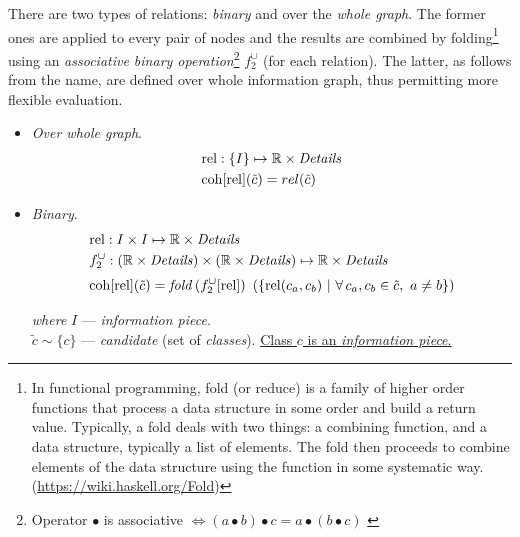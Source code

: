 \documentclass[../ThesisDoc]{subfiles}
\begin{document}
\begin{enumerate}
        There are two types of relations: \emph{binary} and over the \emph{whole graph}.
        The former ones are applied to every pair of nodes and the results are combined
        by folding\footnote{
          In functional programming, fold (or reduce) is a family of higher order
          functions that process a data structure in some order and build a return value.
          Typically, a fold deals with two things: a combining
          function, and a data structure, typically a list of elements.
          The fold then proceeds to combine elements of the data structure using
          the function in some systematic way. (\url{https://wiki.haskell.org/Fold})
        } using an \emph{associative binary operation}\footnote{%
          Operator $\bullet$ is associative
          $\Leftrightarrow (a \bullet b) \bullet c = a \bullet (b \bullet c)$
            \label{footnote:binary-operation}
        } $f^\cup_2$ (for each relation).
        The latter, as follows from the name, are defined over whole information graph,
        thus permitting more flexible evaluation.
        \begin{itemize}
          \item \emph{Over whole graph}.
            \begin{align*}
              & \mathrm{rel}: \lbrace I \rbrace \mapsto \mathbb{R} \times \mathit{Details} \\
              & \mathrm{coh}[\mathrm{rel}](\tilde{c}) = rel(\tilde{c})
            \end{align*}
          \item \emph{Binary}.
            \begin{align*}
              & \mathrm{rel}: I \times I \mapsto \mathbb{R} \times \mathit{Details} \\
              & f^\cup_2: (\mathbb{R} \times \mathit{Details}) \times
                          (\mathbb{R} \times \mathit{Details})
                   \mapsto \mathbb{R} \times \mathit{Details} \\[0.3em]
              & \mathrm{coh}[\mathrm{rel}](\tilde{c}) = \mathit{fold}\, (f^\cup_2[\mathrm{rel}]) ~
                  \left(\lbrace \mathrm{rel}(c_a,c_b) ~|~ \forall\, c_a,c_b \in \tilde{c}
                                          , ~ a \not= b \rbrace\right)
            \end{align*}
          \item[\emph{where}] $I$ --- \emph{information piece}. \\\noindent
                              $\tilde{c} \sim \{c\}$ --- \emph{candidate}
                              (set of \emph{classes}).
                              \underline{Class $c$ is an \emph{information piece}.}


\end{itemize}
\end{enumerate}
\end{document}
